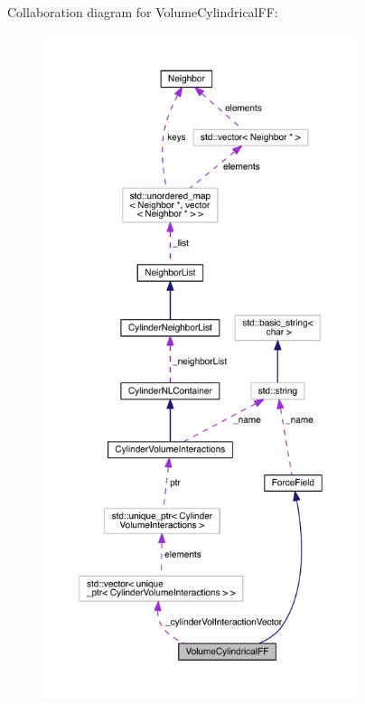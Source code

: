 Collaboration diagram for Volume\+Cylindrical\+F\+F\+:\nopagebreak
\begin{figure}[H]
\begin{center}
\leavevmode
\includegraphics[height=550pt]{classVolumeCylindricalFF__coll__graph}
\end{center}
\end{figure}
